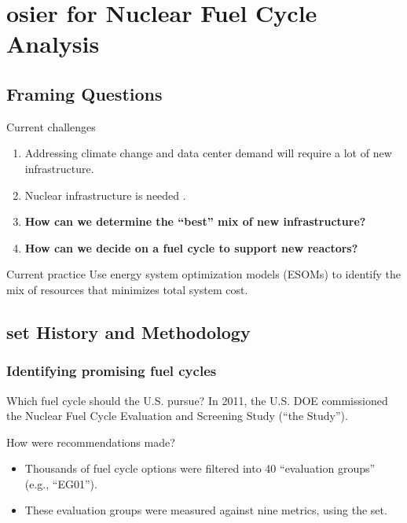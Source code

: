 \section{\gls{osier} for Nuclear Fuel Cycle Analysis}

\subsection{Framing Questions}
\begin{frame}
    \begin{block}{Current challenges}
    \begin{enumerate}[<+->]
        \item Addressing climate change and data center demand will require a
        lot of new infrastructure.
        \item Nuclear infrastructure is needed
        \cite{julie_kozeracki_pathways_2024}.
        \item \textbf{How can we determine the ``best'' mix of new
        infrastructure?}
        \item \textbf{How can we decide on a fuel cycle to support new
        reactors?}
    \end{enumerate}    
    \end{block}
    \pause
    \begin{block}{Current practice}
        Use energy system optimization models (ESOMs) to identify the mix of
        resources that minimizes total system cost.
    \end{block}
\end{frame}

\subsection{\gls{set} History and Methodology}
\begin{frame}
    \frametitle{Identifying promising fuel cycles}
    \begin{block}{Which fuel cycle should the U.S. pursue?}
        In 2011, the U.S. \Gls{DOE} commissioned the Nuclear Fuel Cycle
        Evaluation and Screening Study (``the Study'').
    \end{block}
    \pause
    \begin{block}{How were recommendations made?}
        \begin{itemize}[<+->]
            \item Thousands of fuel cycle options were filtered into 40
            ``evaluation groups'' (e.g., ``EG01'').
            \item These evaluation groups were measured against nine metrics,
            using the \gls{set}.
        \end{itemize}
    \end{block}
\end{frame}

